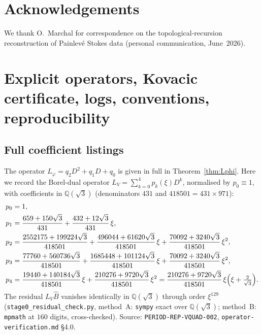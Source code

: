 \documentclass[11pt,reqno]{amsart}
\theoremstyle{plain}
\theoremstyle{definition}
\newcommand{\Bhat}{\widehat{B}}
\newcommand{\Lphi}{L_{\varphi}}
\newcommand{\LV}{L_{V}}
\newcommand{\Qsqrt}{\mathbb{Q}(\sqrt3)}
\begin{document}
\section*{Acknowledgements}
We thank O.~Marchal for correspondence on the topological-recursion reconstruction of Painlev\'e
Stokes data (personal communication, June~2026).

\appendix
\section{Explicit operators, Kovacic certificate, logs, conventions, reproducibility}\label{app:all}

\subsection{Full coefficient listings}\label{app:coeffs}
The operator $\Lphi=q_2D^2+q_1D+q_0$ is given in full in Theorem~\ref{thm:Lphi}. Here we record
the Borel-dual operator $\LV=\sum_{k=0}^4 p_k(\xi)D^k$, normalised by $p_0\equiv1$, with
coefficients in $\Qsqrt$ (denominators $431$ and $418501=431\times971$):
\begin{align*}
  p_0&=1,\\
  p_1&=\frac{659+150\sqrt3}{431}+\frac{432+12\sqrt3}{431}\,\xi,\\
  p_2&=\frac{2552175+199224\sqrt3}{418501}
       +\frac{496044+61620\sqrt3}{418501}\,\xi
       +\frac{70092+3240\sqrt3}{418501}\,\xi^2,\\
  p_3&=\frac{77760+560736\sqrt3}{418501}
       +\frac{1685448+101124\sqrt3}{418501}\,\xi
       +\frac{70092+3240\sqrt3}{418501}\,\xi^2,\\
  p_4&=\frac{19440+140184\sqrt3}{418501}\,\xi
       +\frac{210276+9720\sqrt3}{418501}\,\xi^2
       =\frac{210276+9720\sqrt3}{418501}\,\xi\Bigl(\xi+\tfrac{2}{\sqrt3}\Bigr).
\end{align*}
The residual $\LV\Bhat$ vanishes identically in $\Qsqrt$ through order $\xi^{129}$
(\texttt{stage0\_residual\_check.py}, method~A: \texttt{sympy} exact over $\Qsqrt$; method~B:
\texttt{mpmath} at $160$ digits, cross-checked). Source: \texttt{PERIOD-REP-VQUAD-002},
\texttt{operator-verification.md} \S4.0.
\end{document}
